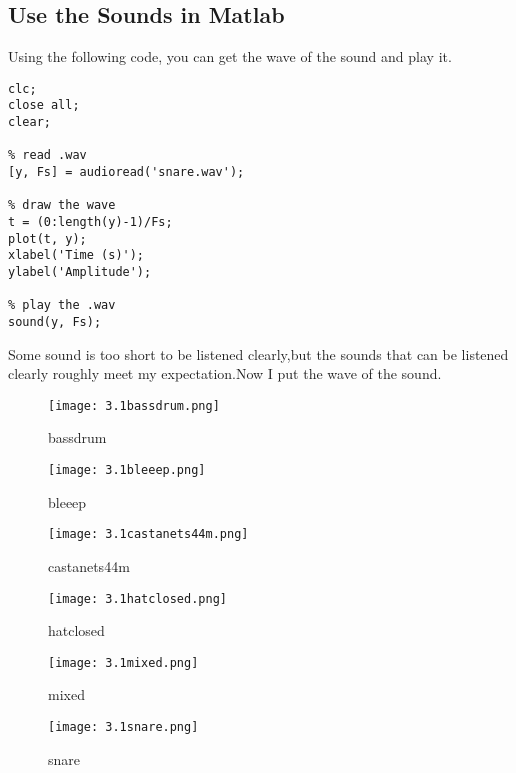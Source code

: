 \documentclass{article}
\begin{document}
\subsection{Use the Sounds in Matlab}
Using the following code, you can get the wave of the sound and play it.
\begin{lstlisting}
clc;
close all;
clear;

% read .wav
[y, Fs] = audioread('snare.wav'); 

% draw the wave
t = (0:length(y)-1)/Fs; 
plot(t, y);
xlabel('Time (s)');
ylabel('Amplitude');

% play the .wav
sound(y, Fs); 
\end{lstlisting}
Some sound is too short to be listened clearly,but 
the sounds that can be listened clearly roughly 
meet my expectation.Now I put the wave of the sound.
\begin{figure}[h]
    \begin{minipage}{0.45\textwidth}
        \centering
        \texttt{[image: 3.1bassdrum.png]}
        \caption{bassdrum}
    \end{minipage}
    \begin{minipage}{0.45\textwidth}
        \centering
        \texttt{[image: 3.1bleeep.png]}
        \caption{bleeep}
    \end{minipage}
    \quad

    \begin{minipage}{0.45\textwidth}
        \centering
        \texttt{[image: 3.1castanets44m.png]}
        \caption{castanets44m}
    \end{minipage}
    \begin{minipage}{0.45\textwidth}
        \centering
        \texttt{[image: 3.1hatclosed.png]}
        \caption{hatclosed}
    \end{minipage}
    \quad

    \begin{minipage}{0.45\textwidth}
        \centering
        \texttt{[image: 3.1mixed.png]}
        \caption{mixed}
    \end{minipage}
    \begin{minipage}{0.45\textwidth}
        \centering
        \texttt{[image: 3.1snare.png]}
        \caption{snare}
    \end{minipage}
\end{figure} 

\newpage
\end{document}
